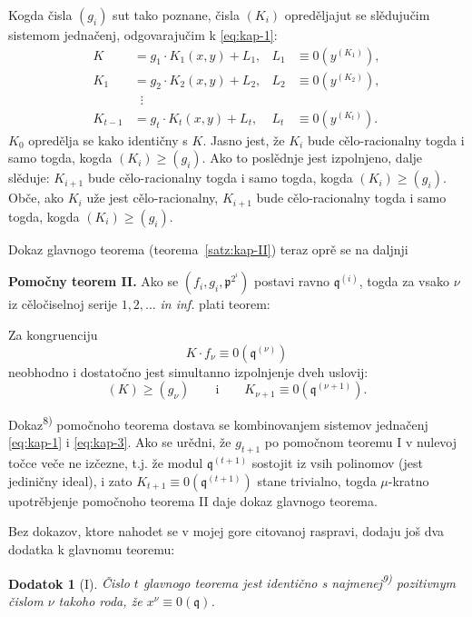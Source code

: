 \documentclass[11pt]{article}
\theoremstyle{plain}
\newtheorem{zusatz}{Dodatok}
\begin{document}
Kogda čisla $(g_{i})$ sut tako poznane, čisla $(K_{i})$ opreděljajut
se slědujučim sistemom jednačenj, odgovarajučim k \eqref{eq:kap-1}:
\begin{equation}\label{eq:kap-3}
\begin{aligned}
K &= g_{1} \cdot K_{1}(x,y) + L_{1}, & L_{1} &\equiv 0(y^{(K_{1})}),\\
K_{1} &= g_{2} \cdot K_{2}(x,y) + L_{2}, & L_{2} &\equiv 0(y^{(K_{2})}),\\
&\;\;\vdots &&\\
K_{t-1} &= g_{t} \cdot K_{t}(x,y) + L_{t}, & L_{t} &\equiv 0(y^{(K_{t})}).
\end{aligned}
\end{equation}
$K_{0}$ opredělja se kako identičny s $K$. Jasno jest, že $K_{i}$
bude cělo-racionalny togda i samo togda, kogda
$(K_{i}) \geq (g_{i})$. Ako to poslědnje jest izpolnjeno, dalje
slěduje: $K_{i+1}$ bude cělo-racionalny togda i samo togda, kogda
$(K_{i}) \geq (g_{i})$. Obče, ako $K_{i}$ uže jest cělo-racionalny,
$K_{i+1}$ bude cělo-racionalny togda i samo togda, kogda
$(K_{i}) \geq (g_{i})$.

Dokaz glavnogo teorema (teorema~\ref{satz:kap-II}) teraz oprě se na
daljnji

\smallskip
\textbf{Pomočny teorem II.} Ako se
$(f_{i}, g_{i}, \mathfrak{p}^{2^{i}})$ postavi ravno
$\mathfrak{q}^{(i)}$, togda za vsako $\nu$ iz cěločiselnoj serije
$1, 2, \ldots$ \textit{in inf.} plati teorem:

Za kongruenciju
\[
K \cdot f_{\nu} \equiv 0(\mathfrak{q}^{(\nu)})
\]
neobhodno i dostatočno jest simultanno izpolnjenje dveh uslovij:
\[
(K) \geq (g_{\nu}) \qquad \text{i} \qquad K_{\nu+1} \equiv 0(\mathfrak{q}^{(\nu+1)}).
\]

Dokaz\textsuperscript{8)} pomočnoho teorema dostava se kombinovanjem
sistemov jednačenj \eqref{eq:kap-1} i \eqref{eq:kap-3}. Ako se
urědni, že $g_{t+1}$ po pomočnom teoremu I v nulevoj točce veče ne
izčezne, t.j. že modul $\mathfrak{q}^{(t+1)}$ sostojit iz vsih
polinomov (jest jediničny ideal), i zato
$K_{t+1} \equiv 0(\mathfrak{q}^{(t+1)})$ stane trivialno, togda
$\mu$-kratno upotrěbjenje pomočnoho teorema II daje dokaz glavnogo
teorema.

\smallskip
Bez dokazov, ktore nahodet se v mojej gore citovanoj raspravi,
dodaju još dva dodatka k glavnomu teoremu:

\begin{zusatz}[I]
Čislo $t$ glavnogo teorema jest identično s najmenej\textsuperscript{9)}
pozitivnym čislom $\nu$ takoho roda, že
$x^{\nu} \equiv 0(\mathfrak{q})$.
\end{zusatz}
\end{document}

